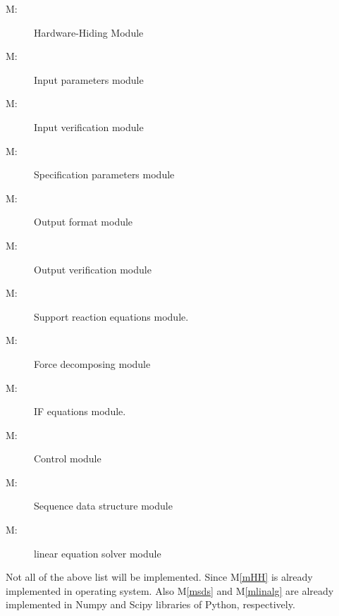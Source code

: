 \documentclass[12pt, titlepage]{article}
\newcounter{mnum}
\newcommand{\mthemnum}{M\themnum}
\begin{document}
\begin{description}
\item [ \mthemnum \label{mHH}:] Hardware-Hiding Module
\item [ \mthemnum \label{mIn}:] Input parameters module
\item [ \mthemnum \label{mparam}:] Input verification module
\item [ \mthemnum \label{mSpec}:] Specification parameters module 
\item [ \mthemnum \label{mout}:] Output format module
\item [ \mthemnum \label{mverify}:] Output verification module
\item [ \mthemnum \label{mreact}:] Support reaction equations module. 
\item [ \mthemnum \label{mdecomp}:] Force decomposing module
\item [ \mthemnum \label{minternal}:] \mbox{IF} equations module.
\item [ \mthemnum \label{mControl}:] Control module
\item [ \mthemnum \label{msds}:] Sequence data structure module
\item [ \mthemnum \label{mlinalg}:] linear equation solver module

\end{description} 
Not all of the above list will be implemented. Since M\ref{mHH} is already implemented in operating system. Also M\ref{msds} and  M\ref{mlinalg} are already implemented in Numpy and Scipy libraries of Python, respectively.
\end{document}
